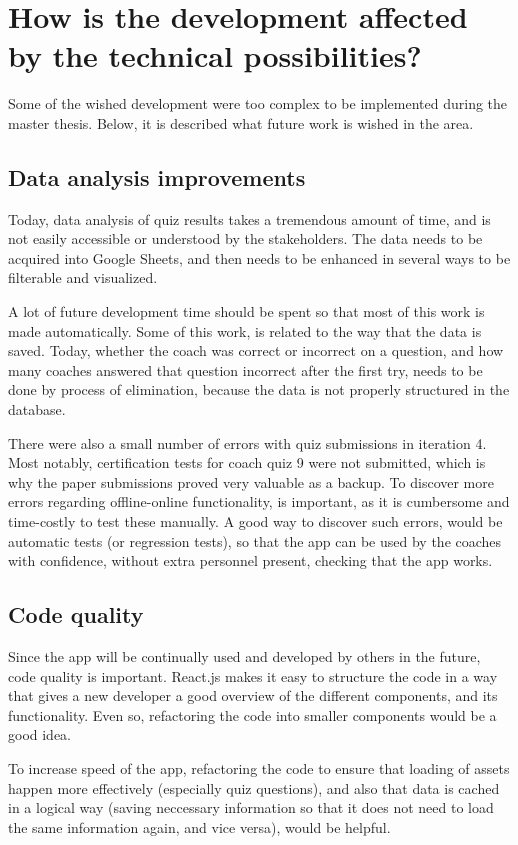\section{How is the development affected by the technical possibilities?}\label{rq1}

Some of the wished development were too complex to be implemented during the master thesis. Below, it is described what future work is wished in the area.

\subsection{Data analysis improvements}
Today, data analysis of quiz results takes a tremendous amount of time, and is not easily accessible or understood by the stakeholders. The data needs to be acquired into Google Sheets, and then needs to be enhanced in several ways to be filterable and visualized.

A lot of future development time should be spent so that most of this work is made automatically. Some of this work, is related to the way that the data is saved. Today, whether the coach was correct or incorrect on a question, and how many coaches answered that question incorrect after the first try, needs to be done by process of elimination, because the data is not properly structured in the database.

There were also a small number of errors with quiz submissions in iteration 4. Most notably, certification tests for coach quiz 9 were not submitted, which is why the paper submissions proved very valuable as a backup. To discover more errors regarding offline-online functionality, is important, as it is cumbersome and time-costly to test these manually. A good way to discover such errors, would be automatic tests (or regression tests), so that the app can be used by the coaches with confidence, without extra personnel present, checking that the app works.

\subsection{Code quality}
Since the app will be continually used and developed by others in the future, code quality is important. React.js makes it easy to structure the code in a way that gives a new developer a good overview of the different components, and its functionality. Even so, refactoring the code into smaller components would be a good idea.

To increase speed of the app, refactoring the code to ensure that loading of assets happen more effectively (especially quiz questions), and also that data is cached in a logical way (saving neccessary information so that it does not need to load the same information again, and vice versa), would be helpful.

